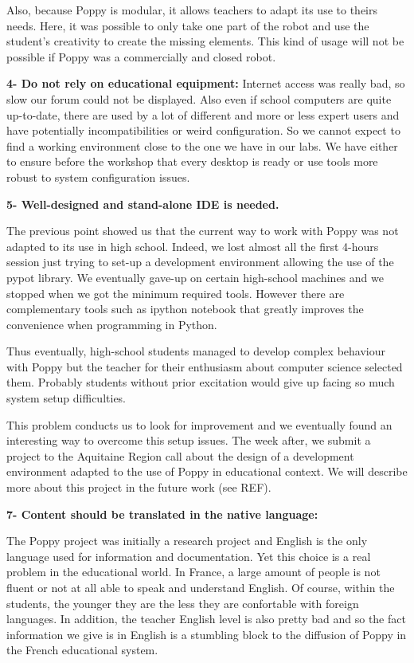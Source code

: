 Also, because Poppy is modular, it allows teachers to adapt its use to theirs needs. Here, it was possible to only take one part of the robot and use the student’s creativity to create the missing elements. This kind of usage will not be possible if Poppy was a commercially and closed robot.

\textbf{4- Do not rely on educational equipment:}
Internet access was really bad, so slow our forum could not be displayed. Also even if school computers are quite up-to-date, there are used by a lot of different and more or less expert users and have potentially incompatibilities or weird configuration. So we cannot expect to find a working environment close to the one we have in our labs.
We have either to ensure before the workshop that every desktop is ready or use tools more robust to system configuration issues.

\textbf{5- Well-designed and stand-alone IDE is needed.}

The previous point showed us that the current way to work with Poppy was not adapted to its use in high school. Indeed, we lost almost all the first 4-hours session just trying to set-up a development environment allowing the use of the pypot library. We eventually gave-up on certain high-school machines and we stopped when we got the minimum required tools. However there are complementary tools such as ipython notebook that greatly improves the convenience when programming in Python.

Thus eventually, high-school students managed to develop complex behaviour with Poppy but the teacher for their enthusiasm about computer science selected them. Probably students without prior excitation would give up facing so much system setup difficulties.

This problem conducts us to look for improvement and we eventually found an interesting way to overcome this setup issues. The week after, we submit a project to the Aquitaine Region call about the design of a development environment adapted to the use of Poppy in educational context. We will describe more about this project in the future work (see REF).


\textbf{7- Content should be translated in the native language:}

The Poppy project was initially a research project and English is the only language used for information and documentation. Yet this choice is a real problem in the educational world. In France, a large amount of people is not fluent or not at all able to speak and understand English. Of course, within the students, the younger they are the less they are confortable with foreign languages. In addition, the teacher English level is also pretty bad and so the fact information we give is in English is a stumbling block to the diffusion of Poppy in the French educational system.



